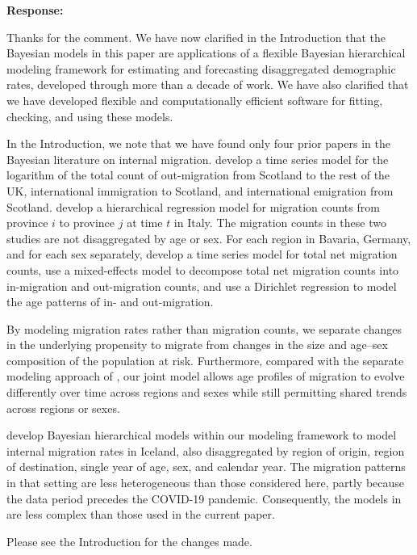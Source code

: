\documentclass[11pt,a4paper]{article}
\newlength{\replyspace}
\newenvironment{response}{\par\addvspace{\replyspace}\nopagebreak\textbf{\textcolor{replyblue}{Response:}}\par\begingroup\color{replyblue}}{\par\endgroup\vspace{\replyspace}}
\begin{document}
\begin{response}
Thanks for the comment. We have now clarified in the Introduction that the Bayesian models in this paper are applications of a flexible Bayesian hierarchical modeling framework for estimating and forecasting disaggregated demographic rates, developed through more than a decade of work. We have also clarified that we have developed flexible and computationally efficient software for fitting, checking, and using these models.

In the Introduction, we note that we have found only four prior papers in the Bayesian literature on internal migration.  \citet{wisniowski2014baysian} develop a time series model for the logarithm of the total count of out-migration from Scotland to the rest of the UK, international immigration to Scotland, and international emigration from Scotland. \citet{furfaro2021bayesian} develop a hierarchical regression model for migration counts from province 
$i$ to province $j$ at time $t$ in Italy. The migration counts in these two studies are not disaggregated by age or sex. For each region in Bavaria, Germany, and for each sex separately, \citet{goes2026probabilistic} develop a time series model for total net migration counts, use a mixed-effects model to decompose total net migration counts into in-migration and out-migration counts, and use a Dirichlet regression to model the age patterns of in- and out-migration.

By modeling migration rates rather than migration counts, we separate changes in the underlying propensity to migrate from changes in the size and age–sex composition of the population at risk. Furthermore, compared with the separate modeling approach of \citet{goes2026probabilistic}, our joint model allows age profiles of migration to evolve differently over time across regions and sexes while still permitting shared trends across regions or sexes.

\citet{zhang2020bayesian} develop Bayesian hierarchical models within our modeling framework to model internal migration rates in Iceland, also disaggregated by region of origin, region of destination, single year of age, sex, and calendar year. The migration patterns in that setting are less heterogeneous than those considered here, partly because the data period precedes the COVID-19 pandemic. Consequently, the models in \citet{zhang2020bayesian} are less complex than those used in the current paper.

Please see the Introduction for the changes made.
\end{response}
\end{document}
